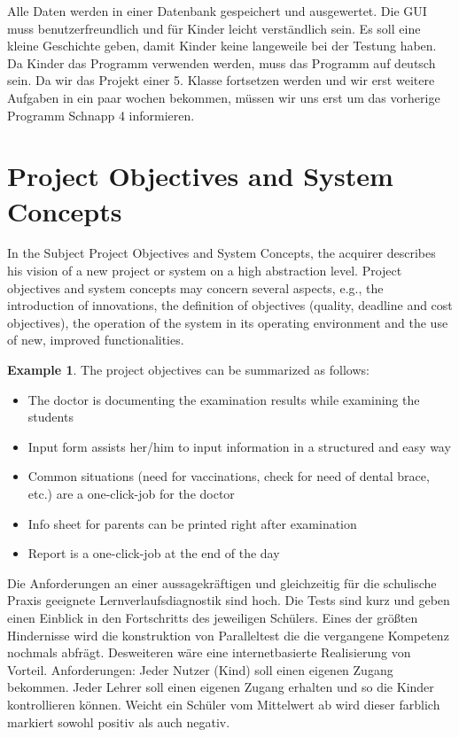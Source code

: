 \documentclass[12pt]{article}
\theoremstyle{definition}
\newtheorem{example}{Example}
\newenvironment{explanation}{%
   \setlength{\parindent}{0pt}
   \itshape
   \color{blue}
}{}
\begin{document}
\begin{description}
	Alle Daten werden in einer Datenbank gespeichert und ausgewertet.
	Die GUI muss benutzerfreundlich und für Kinder leicht verständlich sein.
	Es soll eine kleine Geschichte geben, damit Kinder keine langeweile bei der Testung haben.
	Da Kinder das Programm verwenden werden, muss das Programm auf deutsch sein. 
	Da wir das Projekt einer 5. Klasse fortsetzen werden und wir erst weitere Aufgaben in ein paar wochen bekommen, müssen wir uns erst um das vorherige Programm Schnapp 4 informieren.

\end{description}

\pagebreak

\section{Project Objectives and System Concepts}
\begin{explanation}
In the Subject Project Objectives and System Concepts, the acquirer describes his vision of a new project or system on a high abstraction level. Project objectives and system concepts may concern several aspects, e.g., the introduction of innovations, the definition of objectives (quality, deadline and cost objectives), the operation of the system in its operating environment and the use of new, improved functionalities.
\end{explanation}

\begin{example}
The project objectives can be summarized as follows:
\begin{itemize}
\item The doctor is documenting the examination results while examining the students
\item Input form assists her/him to input information in a structured and easy way
\item Common situations (need for vaccinations, check for need of dental brace, etc.) are a one-click-job for the doctor
\item Info sheet for parents can be printed right after examination
\item Report is a one-click-job at the end of the day
\end{itemize}
\end{example}



Die Anforderungen an einer aussagekräftigen und gleichzeitig für die schulische Praxis geeignete Lernverlaufsdiagnostik sind hoch. Die Tests sind kurz und geben einen Einblick in den Fortschritts des jeweiligen Schülers.
Eines der größten Hindernisse wird die konstruktion von Paralleltest die die vergangene Kompetenz nochmals abfrägt. Desweiteren wäre eine internetbasierte Realisierung von Vorteil.
Anforderungen:
Jeder Nutzer (Kind) soll einen eigenen Zugang bekommen.
Jeder Lehrer soll einen eigenen Zugang erhalten und so die Kinder kontrollieren können.
Weicht ein Schüler vom Mittelwert ab wird dieser farblich markiert sowohl positiv als auch negativ.
\end{document}
